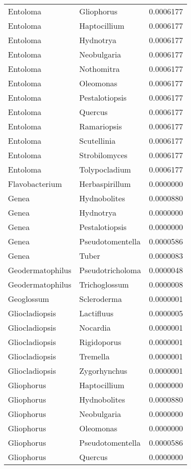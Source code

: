 \documentclass[border=1mm]{standalone}
\begin{document}
\begin{longtable}[t]{lll}
\addlinespace
Entoloma & Gliophorus & 0.0006177\\
Entoloma & Haptocillium & 0.0006177\\
Entoloma & Hydnotrya & 0.0006177\\
Entoloma & Neobulgaria & 0.0006177\\
Entoloma & Nothomitra & 0.0006177\\
\addlinespace
Entoloma & Oleomonas & 0.0006177\\
Entoloma & Pestalotiopsis & 0.0006177\\
Entoloma & Quercus & 0.0006177\\
Entoloma & Ramariopsis & 0.0006177\\
Entoloma & Scutellinia & 0.0006177\\
\addlinespace
Entoloma & Strobilomyces & 0.0006177\\
Entoloma & Tolypocladium & 0.0006177\\
Flavobacterium & Herbaspirillum & 0.0000000\\
Genea & Hydnobolites & 0.0000880\\
Genea & Hydnotrya & 0.0000000\\
\addlinespace
Genea & Pestalotiopsis & 0.0000000\\
Genea & Pseudotomentella & 0.0000586\\
Genea & Tuber & 0.0000083\\
Geodermatophilus & Pseudotricholoma & 0.0000048\\
Geodermatophilus & Trichoglossum & 0.0000008\\
\addlinespace
Geoglossum & Scleroderma & 0.0000001\\
Gliocladiopsis & Lactifluus & 0.0000005\\
Gliocladiopsis & Nocardia & 0.0000001\\
Gliocladiopsis & Rigidoporus & 0.0000001\\
Gliocladiopsis & Tremella & 0.0000001\\
\addlinespace
Gliocladiopsis & Zygorhynchus & 0.0000001\\
Gliophorus & Haptocillium & 0.0000000\\
Gliophorus & Hydnobolites & 0.0000880\\
Gliophorus & Neobulgaria & 0.0000000\\
Gliophorus & Oleomonas & 0.0000000\\
\addlinespace
Gliophorus & Pseudotomentella & 0.0000586\\
Gliophorus & Quercus & 0.0000000\\

\end{longtable}
\end{document}

